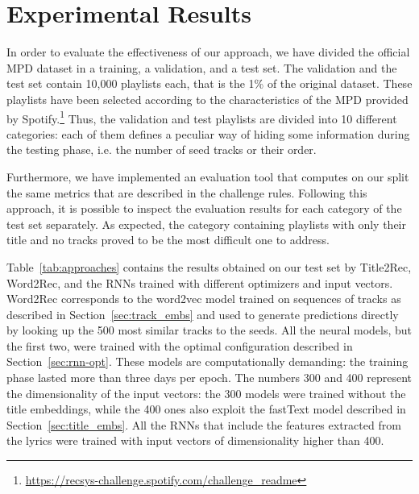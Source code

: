 \section{Experimental Results}
\label{sec:results}
In order to evaluate the effectiveness of our approach, we have divided the official MPD dataset in a training, a validation, and a test set. The validation and the test set contain 10,000 playlists each, that is the 1\% of the original dataset. These playlists have been selected according to the characteristics of the MPD provided by Spotify.\footnote{\url{https://recsys-challenge.spotify.com/challenge_readme}} Thus, the validation and test playlists are divided into 10 different categories: each of them defines a peculiar way of hiding some information during the testing phase, i.e. the number of seed tracks or their order.

Furthermore, we have implemented an evaluation tool that computes on our split the same metrics that are described in the challenge rules. Following this approach, it is possible to inspect the evaluation results for each category of the test set separately. As expected, the category containing playlists with only their title and no tracks proved to be the most difficult one to address.

Table~\ref{tab:approaches} contains the results obtained on our test set by Title2Rec, Word2Rec, and the RNNs trained with different optimizers and input vectors. Word2Rec corresponds to the word2vec model trained on sequences of tracks as described in Section~\ref{sec:track_embs} and used to generate predictions directly by looking up the 500 most similar tracks to the seeds. All the neural models, but the first two, were trained with the optimal configuration described in Section~\ref{sec:rnn-opt}. These models are computationally demanding: the training phase lasted more than three days per epoch. The numbers 300 and 400 represent the dimensionality of the input vectors: the 300 models were trained without the title embeddings, while the 400 ones also exploit the fastText model described in Section~\ref{sec:title_embs}. All the RNNs that include the features extracted from the lyrics were trained with input vectors of dimensionality higher than 400.

